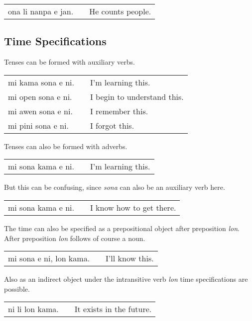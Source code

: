 \begin{supertabular}{p{5,5cm}|ll}
ona li nanpa e jan. && He counts people. \\
\end{supertabular} 
%
%
%
%
\newpage
%
\subsection*{Time Specifications}
%
%
Tenses can be formed with auxiliary verbs. 

\begin{supertabular}{p{5,5cm}|ll}
mi kama sona e ni. && I'm learning this. \\
mi open sona e ni. && I begin to understand this. \\
mi awen sona e ni. && I remember this. \\
mi pini sona e ni. && I forgot this.  \\
\end{supertabular} 

Tenses can also be formed with adverbs. 

\begin{supertabular}{p{5,5cm}|ll}
mi sona kama e ni. && I'm learning this. \\
\end{supertabular} 

But this can be confusing, since \textit{sona} can also be an auxiliary verb here.

\begin{supertabular}{p{5,5cm}|ll}
mi sona kama e ni. && I know how to get there. \\
\end{supertabular} 

The time can also be specified as a prepositional object after preposition \textit{lon}. 
After preposition \textit{lon} follows of course a noun. 

\begin{supertabular}{p{5,5cm}|ll}
mi sona e ni, lon kama. && I'll know this. \\
\end{supertabular} 

Also as an indirect object under the intransitive verb \textit{lon} time specifications are possible.

\begin{supertabular}{p{5,5cm}|ll}
ni li lon kama. && It exists in the future. \\
\end{supertabular} 

